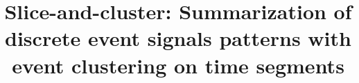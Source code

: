 \documentclass[conference]{IEEEtran}
\begin{document}
\title{Slice-and-cluster: Summarization of discrete event signals patterns with event clustering on time segments
}
\author{
\and
{}
}


\maketitle
\end{document}
